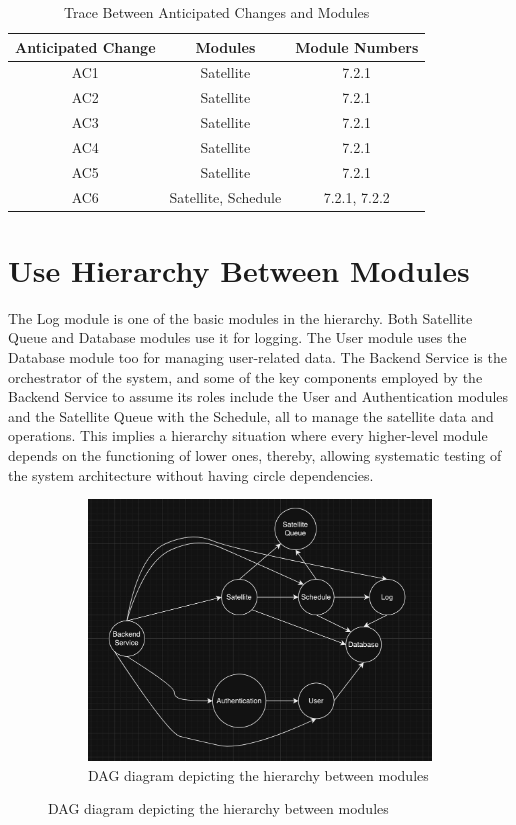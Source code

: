 \documentclass[12pt, titlepage]{article}
\begin{document}
\begin{table}[H]
\centering
\begin{tabular}{|c|c|c|} \hline 
\toprule
Anticipated Change
& Modules & Module Numbers
\\
\midrule

AC1
& Satellite & 7.2.1
\\
AC2
& Satellite & 7.2.1
\\
AC3
& Satellite & 7.2.1
\\
AC4
& Satellite & 7.2.1
\\
AC5
& Satellite & 7.2.1
\\
AC6
& Satellite, Schedule & 7.2.1, 7.2.2
\\
\bottomrule
\end{tabular}
\caption{Trace Between Anticipated Changes and Modules}
\label{TblACT}
\end{table}

\section{Use Hierarchy Between Modules} \label{SecUse}

The Log module is one of the basic modules in the hierarchy. Both Satellite Queue and Database modules use it for logging. The User module uses the Database module too for managing user-related data. The Backend Service is the orchestrator of the system, and some of the key components employed by the Backend Service to assume its roles include the User and Authentication modules and the Satellite Queue with the Schedule, all to manage the satellite data and operations. This implies a hierarchy situation where every higher-level module depends on the functioning of lower ones, thereby, allowing systematic testing of the system architecture without having circle dependencies.



\begin{figure}[H]
\centering
\begin{figure}
    \includegraphics[width=1\linewidth]{hierarchy_dag.png}
    \caption{DAG diagram depicting the hierarchy between modules}
    \label{Use hierarchy among modules}
\end{figure}
\label{FigUH}
\end{figure}
\end{document}
